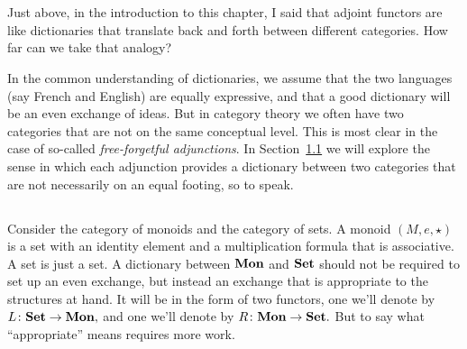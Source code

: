 \documentclass[CT4S-EN-RU]{subfiles}
\begin{document}
\section{}

\begin{blockENG}
Just above, in the introduction to this chapter, I said that adjoint functors are like dictionaries that translate back and forth between different categories. How far can we take that analogy?
\end{blockENG}

\begin{blockRUS}
\end{blockRUS}

\begin{blockENG}
In the common understanding of dictionaries, we assume that the two languages (say French and English) are equally expressive, and that a good dictionary will be an even exchange of ideas. But in category theory we often have two categories that are not on the same conceptual level. This is most clear in the case of so-called {\em free-forgetful adjunctions}. In Section~\ref{sec:adjoints discuss and define} we will explore the sense in which each adjunction provides a dictionary between two categories that are not necessarily on an equal footing, so to speak.
\end{blockENG}

\begin{blockRUS}
\end{blockRUS}


\subsection{}\label{sec:adjoints discuss and define}

\begin{blockENG}
Consider the category of monoids and the category of sets. A monoid $(M,e,\star)$ is a set with an identity element and a multiplication formula that is associative. A set is just a set. A dictionary between ${\mathbf{Mon}}$ and ${\mathbf{Set}}$ should not be required to set up an even exchange, but instead an exchange that is appropriate to the structures at hand. It will be in the form of two functors, one we'll denote by $L\colon{\mathbf{Set}}\rightarrow{\mathbf{Mon}},$ and one we'll denote by $R\colon{\mathbf{Mon}}\rightarrow{\mathbf{Set}}.$ But to say what “appropriate” means requires more work.
\end{blockENG}
\end{document}
